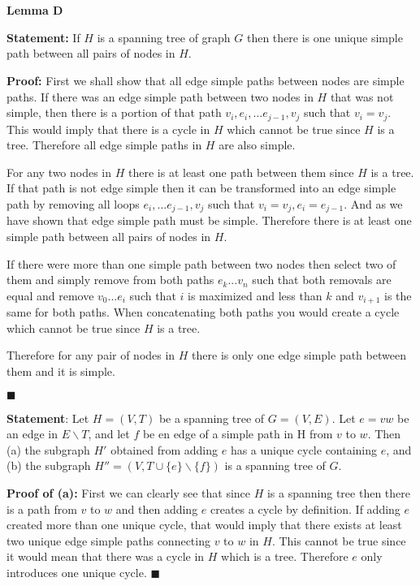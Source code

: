 \documentclass{article}
\newcommand*{\QEDA}{\hfill\ensuremath{\blacksquare}}%
\begin{document}
\section{}
\textbf{Lemma D}

\textbf{Statement:} If $H$ is a spanning tree of graph $G$ then there is one unique simple path between all pairs of nodes in $H$.

\textbf{Proof:} 
First we shall show that all edge simple paths between nodes are simple paths. If there was an edge simple path between two nodes in $H$ that was not simple, then there is a portion of that path $v_i, e_i, ... e_{j-1}, v_j$ such that $v_i = v_j$. This would imply that there is a cycle in $H$ which cannot be true since $H$ is a tree. Therefore all edge simple paths in $H$ are also simple. 

For any two nodes in $H$ there is at least one path between them since $H$ is a tree. If that path is not edge simple then it can be transformed into an edge simple path by removing all loops $e_i, ... e_{j-1}, v_j$ such that $v_i = v_j, e_i = e_{j-1}$. And as we have shown that edge simple path must be simple. Therefore there is at least one simple path between all pairs of nodes in $H$. 

If there were more than one simple path between two nodes then select two of them and simply remove from both paths $e_k...v_n$ such that both removals are equal and remove $v_0...e_i$ such that $i$ is maximized and less than $k$ and $v_{i+1}$ is the same for both paths. When concatenating both paths you would create a cycle which cannot be true since $H$ is a tree. 

Therefore for any pair of nodes in $H$ there is only one edge simple path between them and it is simple.

\QEDA




\textbf{Statement}: Let $H = (V,T)$ be a spanning tree of $G = (V,E)$. Let $e = vw$ be an edge in $E \backslash T$, and let $f$ be en edge of a simple path in H from $v$ to $w$. Then (a) the subgraph $H'$ obtained from adding $e$ has a unique cycle containing $e$, and (b) the subgraph $H'' = (V,T \cup \{e\} \backslash \{f\})$ is a spanning tree of $G$.

\textbf{Proof of (a):} First we can clearly see that since $H$ is a spanning tree then there is a path from $v$ to $w$ and then adding $e$ creates a cycle by definition. If adding $e$ created more than one unique cycle, that would imply that there exists at least two unique edge simple paths connecting $v$ to $w$ in $H$. This cannot be true since it would mean that there was a cycle in $H$ which is a tree. Therefore $e$ only introduces one unique cycle.
\QEDA 
\end{document}
